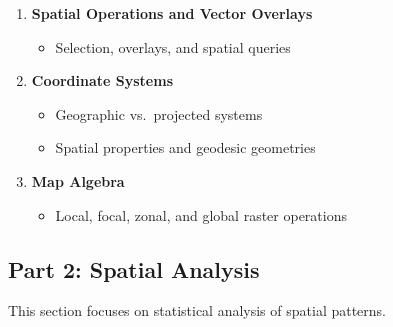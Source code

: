 \documentclass[
  letterpaper,
]{book}
\providecommand{\tightlist}{%
  \setlength{\itemsep}{0pt}\setlength{\parskip}{0pt}}
\begin{document}
\begin{enumerate}
  \begin{itemize}
  \tightlist
  \item
    Map elements, layout, and typography
  \end{itemize}
\item
  \textbf{Spatial Operations and Vector Overlays}

  \begin{itemize}
  \tightlist
  \item
    Selection, overlays, and spatial queries
  \end{itemize}
\item
  \textbf{Coordinate Systems}

  \begin{itemize}
  \tightlist
  \item
    Geographic vs.~projected systems
  \item
    Spatial properties and geodesic geometries
  \end{itemize}
\item
  \textbf{Map Algebra}

  \begin{itemize}
  \tightlist
  \item
    Local, focal, zonal, and global raster operations
  \end{itemize}
\end{enumerate}

\subsection{Part 2: Spatial Analysis}\label{part-2-spatial-analysis}

This section focuses on statistical analysis of spatial patterns.
\end{document}
